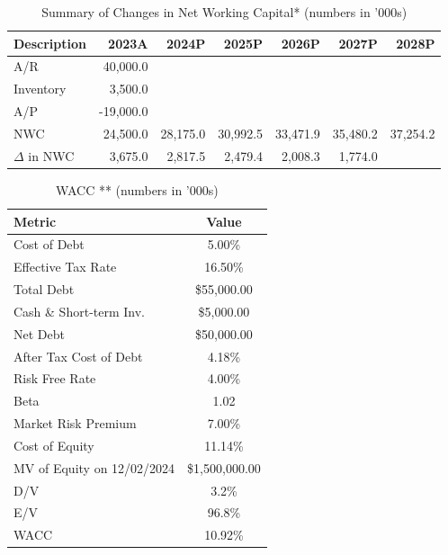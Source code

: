     \begin{table}[ht]
        \centering
        \caption{Summary of Changes in Net Working Capital* (numbers in '000s)}
        \label{tab:nwc_summary}
        \begin{tabular}{@{}lrrrrrr@{}}
        \toprule
        \textbf{Description} & \textbf{2023A} & \textbf{2024P} & \textbf{2025P} & \textbf{2026P} & \textbf{2027P} & \textbf{2028P} \\
        \midrule
        A/R               & 40,000.0 &       &       &       &       &       \\
        Inventory         & 3,500.0  &       &       &       &       &       \\
        A/P               & -19,000.0&       &       &       &       &       \\
        \midrule
        NWC               & 24,500.0 & 28,175.0 & 30,992.5 & 33,471.9 & 35,480.2 & 37,254.2 \\
        $\Delta$ in NWC   & 3,675.0  & 2,817.5 & 2,479.4 & 2,008.3  & 1,774.0  &       \\
        \bottomrule
        \end{tabular}
    \end{table}

\begin{table}[ht]
    \centering
    \caption{WACC ** (numbers in '000s)}
    \label{tab:wacc}
    \begin{tabular}{@{}lc@{}}
    \toprule
    \textbf{Metric}                     & \textbf{Value}    \\
    \midrule
    Cost of Debt                        & 5.00\%            \\
    Effective Tax Rate                  & 16.50\%           \\
    Total Debt                          & \$55,000.00       \\
    Cash \& Short-term Inv.             & \$5,000.00        \\
    Net Debt                            & \$50,000.00       \\
    After Tax Cost of Debt              & 4.18\%            \\
    Risk Free Rate                      & 4.00\%            \\
    Beta                                & 1.02              \\
    Market Risk Premium                 & 7.00\%            \\
    Cost of Equity                      & 11.14\%           \\
    MV of Equity on 12/02/2024          & \$1,500,000.00    \\
    D/V                                 & 3.2\%             \\
    E/V                                 & 96.8\%            \\
    WACC                                & 10.92\%           \\
    \bottomrule
    \end{tabular}
\end{table}

